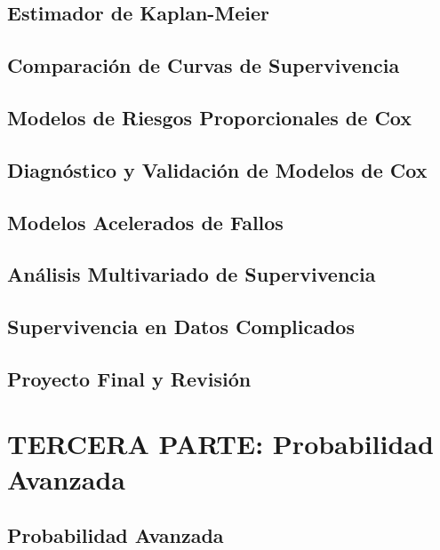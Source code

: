 \documentclass{report}
\begin{document}
\chapter{Estimador de Kaplan-Meier}


\chapter{Comparación de Curvas de Supervivencia}


\chapter{Modelos de Riesgos Proporcionales de Cox}


\chapter{Diagnóstico y Validación de Modelos de Cox}


\chapter{Modelos Acelerados de Fallos}


\chapter{Análisis Multivariado de Supervivencia}


\chapter{Supervivencia en Datos Complicados}


\chapter{Proyecto Final y Revisión}


\part{TERCERA PARTE: Probabilidad Avanzada}

\chapter{Probabilidad Avanzada}
%
\end{document}
